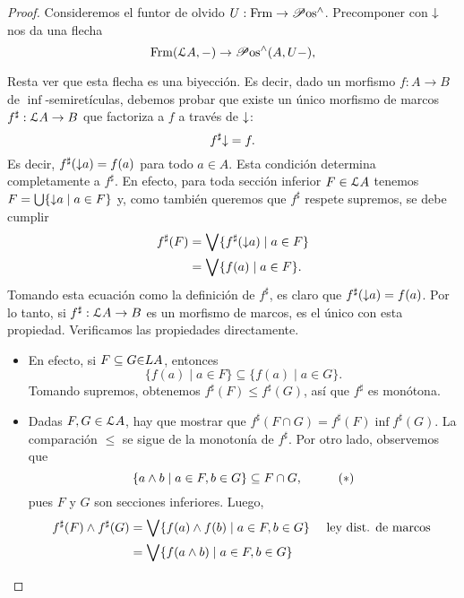 \begin{proof}
    Consideremos el funtor de olvido $U:\Frm\to\Pos^{\inf}$.
    Precomponer con $\down$ nos da una flecha
    \[
        \Frm(\cal LA,-)\to \Pos^{\inf}(A,U-)
    ,\]
    
    Resta ver que esta flecha es una biyección.
    Es decir, dado un morfismo $f:A\to B$
    de $\inf$-semiretículas,
    debemos probar que existe un único morfismo de marcos
    $f^\sharp:\cal LA\to B$ que factoriza a $f$ a través
    de $\down$:
    \[
        f^\sharp\down = f
    .\]
    Es decir, $f^\sharp(\down a)=f(a)$ para todo $a\in A$.
    Esta condición determina completamente a $f^\sharp$.
    En efecto, para toda sección inferior $F\in\cal LA$ tenemos
    $F=\bigcup\{\down a \mid a\in F\}$ y, como también queremos
    que $f^\sharp$ respete supremos, se debe cumplir
    \begin{align*}
        f^\sharp(F)
        &= \Sup\{f^\sharp(\down a) \mid a\in F\} \\
        &= \Sup\{f(a) \mid a\in F\}.
    \end{align*}
    Tomando esta ecuación como la definición de $f^\sharp$, es
    claro que $f^\sharp(\down a)=f(a)$.
    Por lo tanto, si $f^\sharp:\cal LA\to B$ es un
    morfismo de marcos, es el único con esta propiedad.
    Verificamos las propiedades directamente.
    \begin{itemize}
        \item En efecto, si $F\subseteq G\cal\in LA$, entonces 
        \[
            \{f(a) \mid a\in F\} \subseteq \{f(a) \mid a\in G\}
        .\]
        Tomando supremos, obtenemos
        $f^\sharp(F)\leq f^\sharp(G)$, así que $f^\sharp$ es
        monótona.
        \item
        Dadas $F,G\in\cal LA$, hay que mostrar
        que $f^\sharp(F\cap G)=f^\sharp(F)\inf f^\sharp(G)$.
        La comparación $\leq$ se sigue de la monotonía de
        $f^\sharp$.
        Por otro lado, observemos que
        \[
            \{ a\inf b \mid a\in F, b\in G\}
            \subseteq F\cap G,
            \hspace{10mm} (*)
        \]
        pues $F$ y $G$ son secciones inferiores.
        Luego,
        \begin{align*}
            f^\sharp(F)\inf f^\sharp(G)
            &= \Sup\{f(a)\inf f(b) \mid a\in F, b\in G\}
                && \text{ ley dist. de marcos } \\
            &= \Sup\{f(a\inf b) \mid a\in F, b\in G\} \\

\end{align*}
\end{itemize}
\end{proof}
